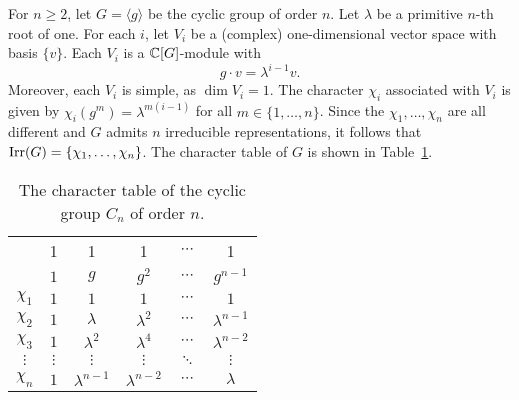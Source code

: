 \begin{example}
    For $n\geq2$, let  
	$G=\langle g\rangle$ be the cyclic group of order $n$. Let $\lambda$ be a primitive $n$-th root of one. For each $i$, 
    let $V_i$ be a (complex) one-dimensional vector space with basis 
	$\{v\}$. Each $V_i$ is a $\mathbb{C}[G]$-module with 
    \[
		g\cdot v=\lambda^{i-1}v.
	\]
	Moreover, each $V_i$ is simple, as $\dim V_i=1$. The character $\chi_i$ associated with 
	$V_i$ is given by $\chi_i(g^m)=\lambda^{m(i-1)}$ for all 
	$m\in\{1,\dots,n\}$. Since the $\chi_1,\dots,\chi_n$ are all different and $G$ admits $n$ irreducible representations,
    it follows that $\operatorname{Irr}(G)=\{\chi_1,\dots,\chi_n\}$. The character
    table of $G$ is shown in Table~\ref{tab:C_n}.
    
    \begin{table}[ht]
    \caption{The character table of the cyclic group $C_n$ of order $n$.} 
    \label{tab:C_n}
		\begin{tabular}{|c|ccccc|}
			\hline 
			& 1 & 1 & 1 & $\cdots$ & 1\tabularnewline
			& $1$ & $g$ & $g^2$ & $\cdots$ & $g^{n-1}$\tabularnewline
			\hline 
			$\chi_{1}$ & $1$ & $1$ & $1$ & $\cdots$ & $1$\tabularnewline
			$\chi_{2}$ & $1$ & $\lambda$ & $\lambda^2$ & $\cdots$ & $\lambda^{n-1}$\tabularnewline
			$\chi_{3}$ & $1$ & $\lambda^2$ & $\lambda^4$ & $\cdots$ & $\lambda^{n-2}$\tabularnewline
			$\vdots$ & $\vdots$ & $\vdots$ & $\vdots$ & $\ddots$ & $\vdots$\tabularnewline
			$\chi_{n}$ & $1$ & $\lambda^{n-1}$ & $\lambda^{n-2}$ & $\cdots$ & $\lambda$\tabularnewline
			\hline
		\end{tabular}
	\end{table}
\end{example}

